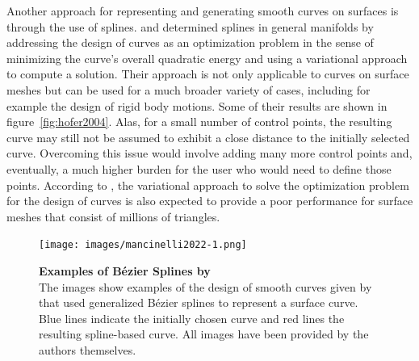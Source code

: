 \documentclass{stdlocal}
\begin{document}
Another approach for representing and generating smooth curves on surfaces is through the use of splines.
\textcite{hofer2004} and \textcite{pottmann2005} determined splines in general manifolds by addressing the design of curves as an optimization problem in the sense of minimizing the curve's overall quadratic energy and using a variational approach to compute a solution.
Their approach is not only applicable to curves on surface meshes but can be used for a much broader variety of cases, including for example the design of rigid body motions.
Some of their results are shown in figure~\ref{fig:hofer2004}.
Alas, for a small number of control points, the resulting curve may still not be assumed to exhibit a close distance to the initially selected curve.
Overcoming this issue would involve adding many more control points and, eventually, a much higher burden for the user who would need to define those points.
According to \textcite{mancinelli2022}, the variational approach to solve the optimization problem for the design of curves is also expected to provide a poor performance for surface meshes that consist of millions of triangles.

\begin{figure}[t]
  \centering
  \texttt{[image: images/mancinelli2022-1.png]}
  \caption[Examples of Bézier Splines by \textcite{mancinelli2022}]{%
    \textbf{Examples of Bézier Splines by \textcite{mancinelli2022}}\\
    The images show examples of the design of smooth curves given by \textcite{mancinelli2022} that used generalized Bézier splines to represent a surface curve.
    Blue lines indicate the initially chosen curve and red lines the resulting spline-based curve.
    All images have been provided by the authors themselves.
  }
  \label{fig:mancinelli2022}
\end{figure}
\end{document}
